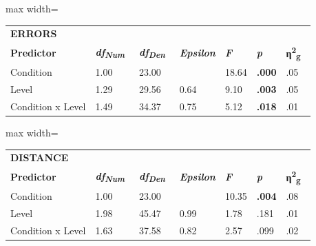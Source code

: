\documentclass[sigconf]{nimeart}
\begin{document}
\begin{table}[htbp]\centering\small
\begin{adjustbox}{max width=\textwidth}\begin{tabular}{lllllll}
\toprule
\midrule
\multicolumn{7}{l}{%
\textbf{ERRORS}} \\
\textbf{Predictor} & \textbf{\emph{df}}\textsubscript{\textbf{\emph{Num~}}} & \textbf{\emph{df}}\textsubscript{\textbf{\emph{Den~}}} & \textbf{\emph{Epsilon}} & \textbf{\emph{F}} & \textbf{\emph{p}} & \textbf{η}\textsuperscript{\textbf{2}}\textsubscript{\textbf{g~}} \\
Condition & 1.00 & 23.00 & 
 & 18.64 & \textbf{.000} & .05 \\
Level & 1.29 & 29.56 & 0.64 & 9.10 & \textbf{.003} & .05 \\
Condition x Level & 1.49 & 34.37 & 0.75 & 5.12 & \textbf{.018} & .01 \\
\bottomrule
\end{tabular}\end{adjustbox}\end{table}

\begin{table}[htbp]\centering\small
\begin{adjustbox}{max width=\textwidth}\begin{tabular}{lllllll}
\toprule
\midrule
\multicolumn{7}{l}{%
\textbf{DISTANCE}} \\
\textbf{Predictor} & \textbf{\emph{df}}\textsubscript{\textbf{\emph{Num~}}} & \textbf{\emph{df}}\textsubscript{\textbf{\emph{Den~}}} & \textbf{\emph{Epsilon}} & \textbf{\emph{F}} & \textbf{\emph{p}} & \textbf{η}\textsuperscript{\textbf{2}}\textsubscript{\textbf{g~}} \\
Condition & 1.00 & 23.00 & 
 & 10.35 & \textbf{.004} & .08 \\
Level & 1.98 & 45.47 & 0.99 & 1.78 & .181 & .01 \\
Condition x Level & 1.63 & 37.58 & 0.82 & 2.57 & .099 & .02 \\
\bottomrule
\end{tabular}\end{adjustbox}\end{table}
\end{document}
